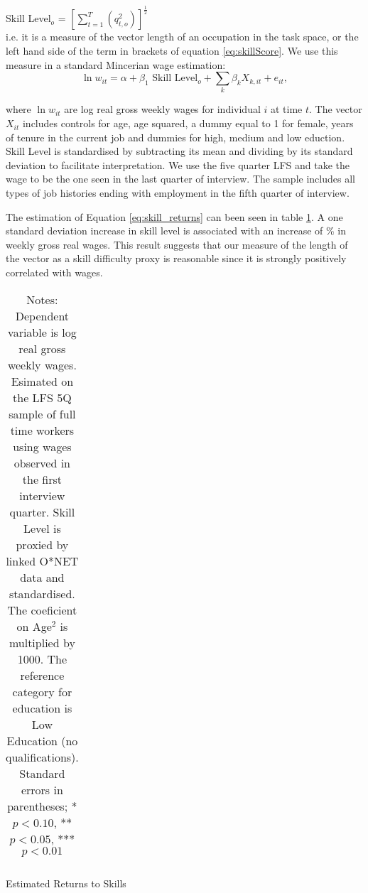 \documentclass[11pt, oneside]{article}
\begin{document}
	 Skill Level$_{o}$ = $\left[\sum_{t=1}^{T}(q_{t,o}^{2})\right]^{\frac{1}{2}} $ \\
	 
	\noindent  i.e. it is a measure of the vector length of an occupation in the task space, or the left hand side of the term in brackets of equation \ref{eq:skillScore}. We use this measure in a standard Mincerian wage estimation: 
	\begin{equation}
	\label{eq:skill_returns}
	\ln w_{it}= \alpha + \beta_{1}\text{ Skill Level}_{o}+  \sum_{k} \beta_{k}X_{k,it} + e_{it}, 
	\end{equation}
	
	where $\ln w_{it}$ are log real gross weekly wages for individual $i$ at time $t$. The vector $X_{it}$ includes controls for age, age squared, a dummy equal to 1 for female, years of tenure in the current job and dummies for high, medium and low eduction. Skill Level is standardised by subtracting its mean and dividing by its standard deviation to facilitate interpretation. We use the five quarter LFS and take the wage to be the one seen in the last quarter of interview. The sample includes all types of job histories ending with employment in the fifth quarter of interview.
	
	\vspace{2mm}
	
	The estimation of Equation \ref{eq:skill_returns} can been seen in table \ref{skill_returns}. A one standard deviation increase in skill level is associated with an increase of \hspace{-1mm}\% in weekly gross real wages. This result suggests that our measure of the length of the vector as a skill difficulty proxy is reasonable since it is strongly positively correlated with wages. 
	
	
	\begin{table}[t]
		\centering
		\begin{tabular}{l*{1}{c}}
			
		\end{tabular}
		\caption{Estimated Returns to Skills} 
		\caption*{\footnotesize Notes: Dependent variable is log real gross weekly wages. Esimated on the LFS 5Q sample of full time workers using wages observed in the first interview quarter. Skill Level is proxied by linked O*NET data and standardised. The coeficient on Age$^2$ is multiplied by 1000. The reference category for education is Low Education (no qualifications). Standard errors in parentheses;	* \(p<0.10\), ** \(p<0.05\), *** \(p<0.01\)}
		\label{skill_returns}
	\end{table}
	
\end{document}
